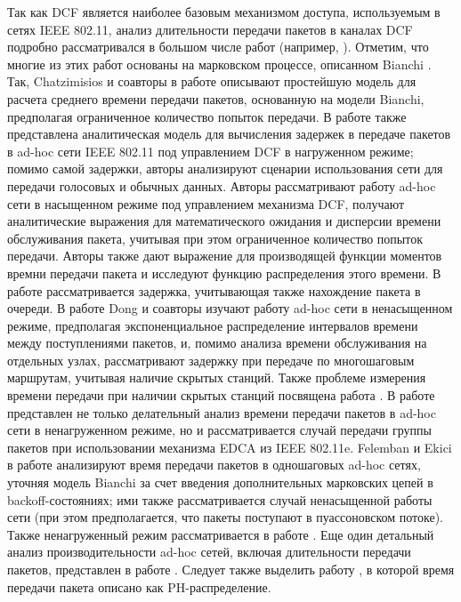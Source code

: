 Так как DCF является наиболее базовым механизмом доступа, используемым в сетях IEEE 802.11, анализ длительности передачи пакетов в каналах DCF подробно рассматривался в большом числе работ (например, \cite{Chat2002, Banchs2006, Sakurai2007, Vardakas2007, Dong2008, Hung2007, Tickoo2008, Felemban2011, Haghani2011, Dai2013, Issar2005}). Отметим, что многие из этих работ основаны на марковском процессе, описанном Bianchi \cite{Bianchi2000}. Так, Chatzimisios и соавторы в работе \cite{Chat2002} описывают простейшую модель для расчета среднего времени передачи пакетов, основанную на модели Bianchi, предполагая ограниченное количество попыток передачи. В работе \cite{Banchs2006} также представлена аналитическая модель для вычисления задержек в передаче пакетов в ad-hoc сети IEEE 802.11 под управлением DCF в нагруженном режиме; помимо самой задержки, авторы анализируют сценарии использования сети для передачи голосовых и обычных данных. Авторы \cite{Sakurai2007} рассматривают работу ad-hoc сети в насыщенном режиме под управлением механизма DCF, получают аналитические выражения для математического ожидания и дисперсии времени обслуживания пакета, учитывая при этом ограниченное количество попыток передачи. Авторы также дают выражение для производящей функции моментов времни передачи пакета и исследуют функцию распределения этого времени. В работе \cite{Vardakas2007} рассматривается задержка, учитывающая также нахождение пакета в очереди. В работе \cite{Dong2008} Dong и соавторы изучают работу ad-hoc сети в ненасыщенном режиме, предполагая экспоненциальное распределение интервалов времени между поступлениями пакетов, и, помимо анализа времени обслуживания на отдельных узлах, рассматривают задержку при передаче по многошаговым маршрутам, учитывая наличие скрытых станций. Также проблеме измерения времени передачи при наличии скрытых станций посвящена работа \cite{Hung2007}. В работе \cite{Tickoo2008} представлен не только делательный анализ времени передачи пакетов в ad-hoc сети в ненагруженном режиме, но и рассматривается случай передачи группы пакетов при использовании механизма EDCA из IEEE 802.11e. Felemban и Ekici в работе \cite{Felemban2011} анализируют время передачи пакетов в одношаговых ad-hoc сетях, уточняя модель Bianchi за счет введения дополнительных марковских цепей в backoff-состояниях; ими также рассматривается случай ненасыщенной работы сети (при этом предполагается, что пакеты поступают в пуассоновском потоке). Также ненагруженный режим рассматривается в работе \cite{Duffy2005}. Еще один детальный анализ производительности ad-hoc сетей, включая длительности передачи пакетов, представлен в работе \cite{Dai2013}. Следует также выделить работу \cite{Issar2005}, в которой время передачи пакета описано как PH-распределение.

